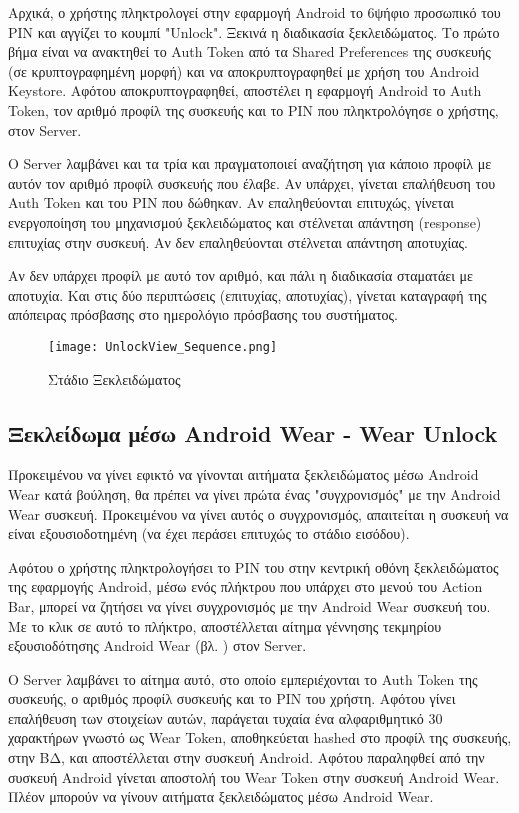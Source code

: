 		Αρχικά, ο χρήστης πληκτρολογεί στην εφαρμογή Android το 6ψήφιο προσωπικό του PIN και αγγίζει το κουμπί "Unlock". Ξεκινά η διαδικασία ξεκλειδώματος. Το πρώτο βήμα είναι να ανακτηθεί το Auth Token από τα Shared Preferences της συσκευής (σε κρυπτογραφημένη μορφή) και να αποκρυπτογραφηθεί με χρήση του Android Keystore. Αφότου αποκρυπτογραφηθεί, αποστέλει η εφαρμογή Android το Auth Token, τον αριθμό προφίλ της συσκευής και το PIN που πληκτρολόγησε ο χρήστης, στον Server.

		Ο Server λαμβάνει και τα τρία και πραγματοποιεί αναζήτηση για κάποιο προφίλ με αυτόν τον αριθμό προφίλ συσκευής που έλαβε. Αν υπάρχει, γίνεται επαλήθευση του Auth Token και του PIN που δώθηκαν. Αν επαληθεύονται επιτυχώς, γίνεται ενεργοποίηση του μηχανισμού ξεκλειδώματος και στέλνεται απάντηση (response) επιτυχίας στην συσκευή. Αν δεν επαληθεύονται στέλνεται απάντηση αποτυχίας.

		Αν δεν υπάρχει προφίλ με αυτό τον αριθμό, και πάλι η διαδικασία σταματάει με αποτυχία. Και στις δύο περιπτώσεις (επιτυχίας, αποτυχίας), γίνεται καταγραφή της απόπειρας πρόσβασης στο ημερολόγιο πρόσβασης του συστήματος.

		\begin{figure}[h]
			\centering
				\texttt{[image: UnlockView\_Sequence.png]}
			\caption{Στάδιο Ξεκλειδώματος}
			\label{fig:unlock_stage}
		\end{figure}

	\subsection{Ξεκλείδωμα μέσω Android Wear - Wear Unlock}
		\label{subsec:wear_unlock}
		Προκειμένου να γίνει εφικτό να γίνονται αιτήματα ξεκλειδώματος μέσω Android Wear κατά βούληση, θα πρέπει να γίνει πρώτα ένας "συγχρονισμός" με την Android Wear συσκευή. Προκειμένου να γίνει αυτός ο συγχρονισμός, απαιτείται η συσκευή να είναι εξουσιοδοτημένη (να έχει περάσει επιτυχώς το στάδιο εισόδου).

		Αφότου ο χρήστης πληκτρολογήσει το PIN του στην κεντρική οθόνη ξεκλειδώματος της εφαρμογής Android, μέσω ενός πλήκτρου που υπάρχει στο μενού του Action Bar, μπορεί να ζητήσει να γίνει συγχρονισμός με την Android Wear συσκευή του. Με το κλικ σε αυτό το πλήκτρο, αποστέλλεται αίτημα γέννησης τεκμηρίου εξουσιοδότησης Android Wear (βλ. ) στον Server.

		Ο Server λαμβάνει το αίτημα αυτό, στο οποίο εμπεριέχονται το Auth Token της συσκευής, ο αριθμός προφίλ συσκευής και το PIN του χρήστη. Αφότου γίνει επαλήθευση των στοιχείων αυτών, παράγεται τυχαία ένα αλφαριθμητικό 30 χαρακτήρων γνωστό ως Wear Token, αποθηκεύεται hashed στο προφίλ της συσκευής, στην ΒΔ, και αποστέλλεται στην συσκευή Android. Αφότου παραληφθεί από την συσκευή Android γίνεται αποστολή του Wear Token στην συσκευή Android Wear. Πλέον μπορούν να γίνουν αιτήματα ξεκλειδώματος μέσω Android Wear.

